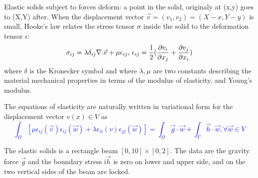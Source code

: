 \documentclass[twoside]{book}
\newif\ifpdf
\def\Blue#1{\textcolor{blue}{#1}}
\begin{document}
\graphicspath{{./}{plots/}}
\ifpdf
\DeclareGraphicsExtensions{.pdf, .jpg, .tif}
\else
{}
\fi

\let\subsubsection\subsection
\let\subsection\section
\let\section\chapter




Elastic solids subject to forces deform: a point in the solid,
originaly at (x,y)
goes to (X,Y) after.  When the displacement vector
$\vec v=(v_1,v_2) = (X-x, Y-y)$  is small, Hooke's
law relates the stress tensor $\sigma$ inside the solid to the
deformation tensor $\epsilon$:
\Blue{
 $$ \sigma_{ij} = \lambda \delta_{ij} \nabla.\vec v + \mu\epsilon_{ij},
\,
\epsilon_{ij} = {1\over 2}({\partial v_i\over\partial x_j} +
{\partial v_j\over\partial x_i} )$$
}
where $\delta$ is the Kronecker symbol
and where $\lambda, \mu$ are two constants describing the material mechanical
properties in terms of the modulus of
elasticity, and Young's modulus.

The equations of elasticity are naturally written in variational form
for the displacement vector $v(x)\in V$ as
\Blue{$$\int_\Omega [\mu\epsilon_{ij}(\vec v)\epsilon_{ij}(\vec w)
+\lambda \epsilon_{ii}(v)\epsilon_{jj}(\vec w)]
=\int_\Omega \vec g\cdot \vec w +\int_\Gamma \vec h\cdot \vec w,%
\forall \vec w\in V
$$}

The  elastic solids  is a rectangle beam $[0,10]\times[0,2]$.
The data are the gravity force $\vec g$ and the
boundary stress i$\vec h$ is zero on lower and upper side, and on the  two vertical sides of the beam are locked.
\bFF
\end{document}
